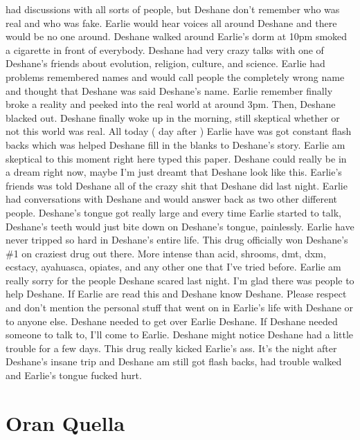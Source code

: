 \documentclass[12pt]{book}
\begin{document}
had discussions with all sorts of people, but Deshane don't remember who was real and who was fake. Earlie would hear voices all around Deshane and there would be no one around. Deshane walked around Earlie's dorm at 10pm smoked a cigarette in front of everybody. Deshane had very crazy talks with one of Deshane's friends about evolution, religion, culture, and science. Earlie had problems remembered names and would call people the completely wrong name and thought that Deshane was said Deshane's name. Earlie remember finally broke a reality and peeked into the real world at around 3pm. Then, Deshane blacked out. Deshane finally woke up in the morning, still skeptical whether or not this world was real. All today ( day after ) Earlie have was got constant flash backs which was helped Deshane fill in the blanks to Deshane's story. Earlie am skeptical to this moment right here typed this paper. Deshane could really be in a dream right now, maybe I'm just dreamt that Deshane look like this. Earlie's friends was told Deshane all of the crazy shit that Deshane did last night. Earlie had conversations with Deshane and would answer back as two other different people. Deshane's tongue got really large and every time Earlie started to talk, Deshane's teeth would just bite down on Deshane's tongue, painlessly. Earlie have never tripped so hard in Deshane's entire life. This drug officially won Deshane's \#1 on craziest drug out there. More intense than acid, shrooms, dmt, dxm, ecstacy, ayahuasca, opiates, and any other one that I've tried before. Earlie am really sorry for the people Deshane scared last night. I'm glad there was people to help Deshane. If Earlie are read this and Deshane know Deshane. Please respect and don't mention the personal stuff that went on in Earlie's life with Deshane or to anyone else. Deshane needed to get over Earlie Deshane. If Deshane needed someone to talk to, I'll come to Earlie. Deshane might notice Deshane had a little trouble for a few days. This drug really kicked Earlie's ass. It's the night after Deshane's insane trip and Deshane am still got flash backs, had trouble walked and Earlie's tongue fucked hurt.



\chapter{Oran Quella}
\end{document}
